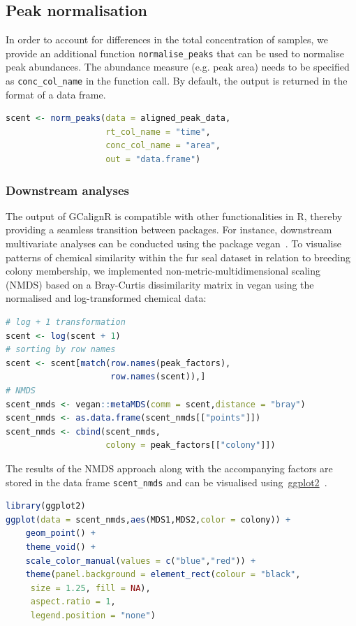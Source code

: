\documentclass[10pt,letterpaper]{article}
\begin{document}
\subsection*{Peak normalisation}
In order to account for differences in the total concentration of samples, we provide an additional function \texttt{normalise\_peaks} that can be used to normalise peak abundances. The abundance measure (e.g. peak area) needs to be specified as \texttt{conc\_col\_name} in the function call. By default, the output is returned in the format of a data frame. 

\begin{lstlisting}[language=R]
scent <- norm_peaks(data = aligned_peak_data,
                    rt_col_name = "time",
                    conc_col_name = "area",
                    out = "data.frame") 
\end{lstlisting}

\subsubsection*{Downstream analyses}
The output of GCalignR is compatible with other functionalities in R, thereby providing a seamless transition between packages. For instance, downstream multivariate analyses can be conducted using the package vegan~\cite{Oksanen.2016}. To visualise patterns of chemical similarity within the fur seal dataset in relation to breeding colony membership, we implemented non-metric-multidimensional scaling (NMDS) based on a Bray-Curtis dissimilarity matrix in vegan using the normalised and log-transformed chemical data:

\begin{lstlisting}[language=R]
# log + 1 transformation
scent <- log(scent + 1) 
# sorting by row names
scent <- scent[match(row.names(peak_factors),
                     row.names(scent)),] 
# NMDS
scent_nmds <- vegan::metaMDS(comm = scent,distance = "bray") 
scent_nmds <- as.data.frame(scent_nmds[["points"]]) 
scent_nmds <- cbind(scent_nmds,
                    colony = peak_factors[["colony"]]) 
\end{lstlisting}

The results of the NMDS approach along with the accompanying factors are stored in the data frame \texttt{scent\_nmds} and can be visualised using~\href{https://CRAN.R-project.org/package=ggplot2}{ggplot2}~\cite{Wickham.2009}.

\begin{lstlisting}[language=R]
library(ggplot2) 
ggplot(data = scent_nmds,aes(MDS1,MDS2,color = colony)) +
    geom_point() + 
    theme_void() + 
    scale_color_manual(values = c("blue","red")) +
    theme(panel.background = element_rect(colour = "black",
     size = 1.25, fill = NA),
     aspect.ratio = 1,
     legend.position = "none")
\end{lstlisting}
\end{document}
